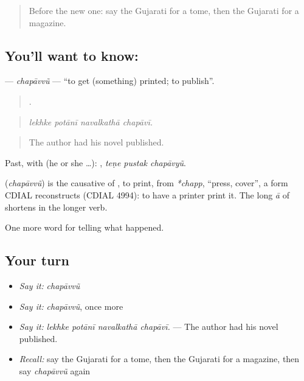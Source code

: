 \label{lesson:GU-C338-chapavvu}



\begin{quote}
Before the new one: say the Gujarati for a tome, then the Gujarati for a magazine.
\end{quote}

\subsection*{You'll want to know: }
\textbf{} — \emph{chapāvvũ} — \textquotedblleft{}to get (something) printed; to publish\textquotedblright{}.

\begin{quote}
   .
\end{quote}

\begin{quote}
\emph{lekhke potānī navalkathā chapāvī.}
\end{quote}

\begin{quote}
The author had his novel published.
\end{quote}

Past, with  (he or she …):   , \emph{teṇe pustak chapāvyũ}.

\begin{cousinweb}
\textbf{} (\emph{chapāvvũ}) is the causative of \textbf{}, to print, from \emph{*chapp}, \textquotedblleft{}press, cover\textquotedblright{}, a form CDIAL reconstructs (CDIAL 4994): to have a printer print it. The long \emph{ā} of \textbf{} shortens in the longer verb.
\end{cousinweb}

\begin{grammarlens}[title={What you've built}]
One more word for telling what happened.
\end{grammarlens}

\subsection*{Your turn}
\begin{itemize}
\raggedright
  \item \emph{Say it:} \emph{chapāvvũ}
  \item \emph{Say it:} \emph{chapāvvũ}, once more
  \item \emph{Say it:} \emph{lekhke potānī navalkathā chapāvī.} — The author had his novel published.
  \item \emph{Recall:} say the Gujarati for a tome, then the Gujarati for a magazine, then say \emph{chapāvvũ} again
\end{itemize}

